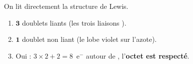 \documentclass[11pt,a4paper]{article}
\begin{document}
\begin{corrige}
On lit directement la structure de Lewis.
\begin{enumerate}[label=\alph*)]
  \item $\mathbf{3}$ doublets liants (les trois liaisons ).
  \item $\mathbf{1}$ doublet non liant (le lobe violet sur l'azote).
  \item Oui : $3\times 2 + 2 = 8$~e$^-$ autour de , l'\textbf{octet est respecté}.
\end{enumerate}
\end{corrige}
\end{document}
